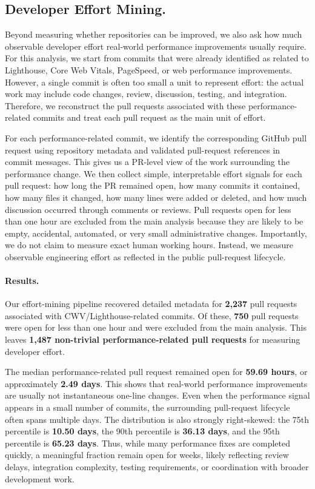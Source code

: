 \subsection{Developer Effort Mining.}
Beyond measuring whether repositories can be improved, we also ask how much observable developer effort real-world performance improvements usually require. For this analysis, we start from commits that were already identified as related to Lighthouse, Core Web Vitals, PageSpeed, or web performance improvements. However, a single commit is often too small a unit to represent effort: the actual work may include code changes, review, discussion, testing, and integration. Therefore, we reconstruct the pull requests associated with these performance-related commits and treat each pull request as the main unit of effort.

For each performance-related commit, we identify the corresponding GitHub pull request using repository metadata and validated pull-request references in commit messages. This gives us a PR-level view of the work surrounding the performance change. We then collect simple, interpretable effort signals for each pull request: how long the PR remained open, how many commits it contained, how many files it changed, how many lines were added or deleted, and how much discussion occurred through comments or reviews. Pull requests open for less than one hour are excluded from the main analysis because they are likely to be empty, accidental, automated, or very small administrative changes. Importantly, we do not claim to measure exact human working hours. Instead, we measure observable engineering effort as reflected in the public pull-request lifecycle.

\paragraph{Results.}
Our effort-mining pipeline recovered detailed metadata for \textbf{2,237} pull requests associated with CWV/Lighthouse-related commits. Of these, \textbf{750} pull requests were open for less than one hour and were excluded from the main analysis. This leaves \textbf{1,487 non-trivial performance-related pull requests} for measuring developer effort.

The median performance-related pull request remained open for \textbf{59.69 hours}, or approximately \textbf{2.49 days}. This shows that real-world performance improvements are usually not instantaneous one-line changes. Even when the performance signal appears in a small number of commits, the surrounding pull-request lifecycle often spans multiple days. The distribution is also strongly right-skewed: the 75th percentile is \textbf{10.50 days}, the 90th percentile is \textbf{36.13 days}, and the 95th percentile is \textbf{65.23 days}. Thus, while many performance fixes are completed quickly, a meaningful fraction remain open for weeks, likely reflecting review delays, integration complexity, testing requirements, or coordination with broader development work.

